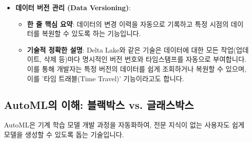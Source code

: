 \documentclass[11pt,a4paper]{article}
\begin{document}
\begin{itemize}
    \item \textbf{데이터 버전 관리 (Data Versioning)}:
    \begin{itemize}
        \item \textbf{한 줄 핵심 요약}: 데이터의 변경 이력을 자동으로 기록하고 특정 시점의 데이터를 복원할 수 있도록 하는 기능입니다.
        \item \textbf{기술적 정확한 설명}: Delta Lake와 같은 기술은 데이터에 대한 모든 작업(업데이트, 삭제 등)마다 명시적인 버전 번호와 타임스탬프를 자동으로 부여합니다. 이를 통해 개발자는 특정 버전의 데이터를 쉽게 조회하거나 복원할 수 있으며, 이를 '타임 트래블(Time Travel)' 기능이라고도 합니다.
    \end{itemize}
\end{itemize}

\newpage
\subsection*{AutoML의 이해: 블랙박스 vs. 글래스박스}

AutoML은 기계 학습 모델 개발 과정을 자동화하여, 전문 지식이 없는 사용자도 쉽게 모델을 생성할 수 있도록 돕는 기술입니다.
\end{document}
